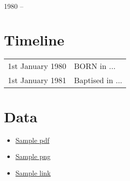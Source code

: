 \begin{center}
\huge{1980 --}
\end{center}

\vspace{1in}

\begin{center}
\end{center}

\newpage
\section{Timeline}
\begin{table}[h]
\renewcommand\arraystretch{1.4}
\begin{tabular}{@{\,}r <{\hskip 2pt} !{\foo} >{\raggedright\arraybackslash}p{20cm}}
\addlinespace[1.5ex]
1st January 1980 & BORN in ...\\
1st January 1981 & Baptised in ... \\
\end{tabular}
\end{table}

\section{Data}
\begin{itemize}
\item \href{run:people/Child1/sample.pdf}{Sample pdf}
\item \href{run:people/Child1/sample.png}{Sample png}
\item \href{https://github.com/StevenElsworth?tab=repositories}{Sample link} 
\end{itemize}